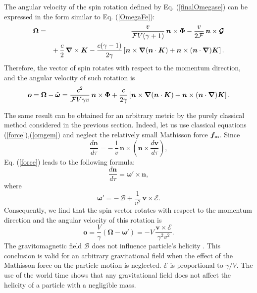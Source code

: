 \documentclass[preprint,showpacs,preprintnumbers,eqsecnum,amsmath,amssymb]{revtex4}
\begin{document}
The angular velocity of the spin rotation defined by Eq. (\ref{finalOmegase}) 
can be expressed in the form similar to Eq. (\ref{OmegaFe}):
\begin{eqnarray}
\bm{\Omega} &=& {\frac v {{\cal F}V(\gamma + 1)}}
\,\bm{n}\times\bm\Phi -{\frac {v} {2{\cal F}}}\,\bm{n}\times
\mbox{\boldmath ${\cal G}$}\nonumber\\
&& +\,{\frac c2}\,\bm{\nabla}\times\bm{K} -{\frac {c(\gamma-1)}{2\gamma}}
\left[\bm{n}\times\bm{\nabla}(\bm{n}\cdot\bm{K})+\bm{n}\times
(\bm{n}\cdot\bm\nabla)\bm{K}\right]. \label{finalOmegred}
\end{eqnarray}
Therefore, the vector of spin rotates with respect to the momentum
direction, and the angular velocity of such rotation is
\begin{eqnarray}
\bm{o} =\bm{\Omega}-\tilde{\bm\omega} ={\frac {c^2} {{\cal
F}V\gamma v}} \,\bm{n}\times\bm\Phi +{\frac {c}{2\gamma}}
\left[\bm{n}\times\bm{\nabla}(\bm{n}\cdot\bm{K})+\bm{n}\times
(\bm{n}\cdot\bm\nabla)\bm{K}\right]. \label{finalOm}
\end{eqnarray}

The same result can be obtained for an arbitrary metric by the
purely classical method considered in the previous section.
Indeed, let us use classical equations (\ref{force}),(\ref{omgem})
and neglect the relatively small Mathisson force ${\bm f}_{\rm m}$. Since
\begin{equation}
\frac{d\bm n}{d\tau} = -\,{\frac 1v}\,{\bm n}\times\left({\bm
n}\times \frac{d{\bm v}}{d\tau}\right),
\end{equation}
Eq. (\ref{force}) leads to the following formula:
\begin{equation}
\frac{d\bm n}{d\tau} = {\bm\omega}'\times{\bm n},\label{finalff}
\end{equation}
where
\begin{equation}\label{finalno}
{\bm\omega}'=-\,\bm{\mathcal{B}}+{\frac 1 {v^2}}\,{\bm v}\times\bm{\mathcal{E}}.
\end{equation}
Consequently, we find that the spin vector rotates with respect to
the momentum direction and the angular velocity of this rotation is
\begin{equation}
{\bm o} = \frac{V}{\gamma}(\bm{\Omega}-\bm{\omega}') = -V\,{\frac {{\bm v}
\times\bm{\mathcal{E}}} {\gamma^2 v^2}}.\label{fino}
\end{equation}
The gravitomagnetic field $\bm{\mathcal{B}}$ does not influence
particle's helicity \cite{Teryaev:2003ch}. This conclusion is
valid for an arbitrary gravitational field when the effect of the
Mathisson force on the particle motion is neglected.
$\bm{\mathcal{E}}$ is proportional to $\gamma/V$. The use of the
world time shows that any gravitational field does not affect the
helicity of a particle with a negligible mass.
\end{document}
